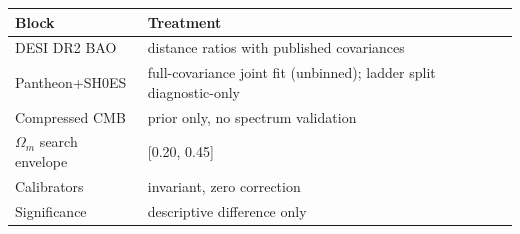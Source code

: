 \begin{tabular}{ll}
\toprule
Block & Treatment \\
\midrule
DESI DR2 BAO & distance ratios with published covariances \\
Pantheon+SH0ES & full-covariance joint fit (unbinned); ladder split diagnostic-only \\
Compressed CMB & prior only, no spectrum validation \\
$\Omega_m$ search envelope & [0.20, 0.45] \\
Calibrators & invariant, zero correction \\
Significance & descriptive difference only \\
\bottomrule
\end{tabular}
